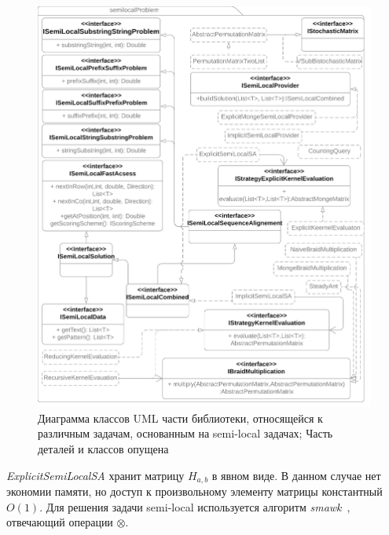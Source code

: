 \begin{figure}
  \centering
  \includegraphics[height=0.72\columnwidth,angle=90]{Mishin/figures/Library.png}
  \caption{Диаграмма классов UML части библиотеки, относящейся к различным задачам, основанным на  semi-local задачах; Часть деталей и классов опущена}\label{fig:libraryProblem}
\end{figure}


\emph{ExplicitSemiLocalSA} хранит матрицу $H_{a,b}$ в явном виде.
В данном случае нет экономии памяти, но доступ к произвольному элементу матрицы константный $O(1)$. 
Для решения задачи semi-local используется алгоритм \emph{smawk}~\cite{aggarwal1987geometric}, отвечающий операции  $\otimes$.






